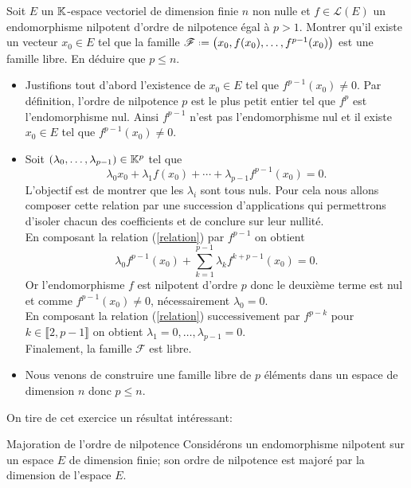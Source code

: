 \begin{exercice}
    Soit $E$ un $\mathbb{K}$-espace vectoriel de dimension finie $n$ non nulle et $f \in \mathscr{L}(E)$ un endomorphisme nilpotent d'ordre de nilpotence égal à $p > 1$. Montrer qu'il existe un vecteur $x_0 \in E$ tel que la famille $\mathscr{F} \defeq \big(x_0, f(x_0), \dots, f^{p-1}(x_0) \big)$ est une famille libre. En déduire que $p \leqslant n$. 
\end{exercice}    

\begin{solution}
    \begin{itemize}
        \item Justifions tout d'abord l'existence de $x_0 \in E$ tel que $f^{p-1}(x_0) \not= 0$. Par définition, l'ordre de nilpotence $p$ est le plus petit entier tel que $f^p$ est l'endomorphisme nul. Ainsi $f^{p-1}$ n'est pas l'endomorphisme nul et il existe $x_0 \in E$ tel que $f^{p-1}(x_0) \not= 0$.
        \item Soit $(\lambda_0, \dots, \lambda_{p-1}) \in \mathbb{K}^p$ tel que 
        \begin{equation}\tag{$\star$} \label{relation}
            \lambda_0 x_0 + \lambda_1 f(x_0) + \cdots + \lambda_{p-1} f^{p-1}(x_0) = 0.
        \end{equation}
        L'objectif est de montrer que les $\lambda_i$ sont tous nuls. Pour cela nous allons composer cette relation par une succession d'applications qui permettrons d'isoler chacun des coefficients et de conclure sur leur nullité. \\
        En composant la relation (\ref{relation}) par $f^{p-1}$ on obtient
        $$\lambda_0 f^{p-1}(x_0) + \sum_{k=1}^{p-1} \lambda_k f^{k + p-1}(x_0) = 0.$$
        Or l'endomorphisme $f$ est nilpotent d'ordre $p$ donc le deuxième terme est nul et comme $f^{p-1}(x_0) \not= 0$, nécessairement $\lambda_0 = 0$. \\
        En composant la relation (\ref{relation}) successivement par $f^{p - k}$ pour $k \in \llbracket 2, p-1 \rrbracket$ on obtient $\lambda_1 = 0, \dots, \lambda_{p-1} = 0$. \\
        Finalement, la famille $\mathscr{F}$ est libre.
        \item Nous venons de construire une famille libre de $p$ éléments dans un espace de dimension $n$ donc $p \leqslant n$. 
    \end{itemize}
\end{solution}
On tire de cet exercice un résultat intéressant:
\begin{prop}{Majoration de l'ordre de nilpotence}
    Considérons un endomorphisme nilpotent sur un espace $E$ de dimension finie; son ordre de nilpotence est majoré par la dimension de l'espace $E$.
\end{prop}
